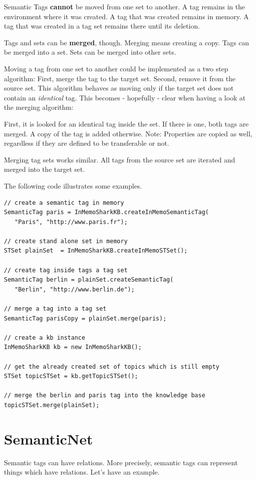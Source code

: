 Semantic Tags {\bf cannot} be moved from one set to another. A tag remains in the environment where it was created. A tag that was created remains in memory. A tag that was created in a tag set remains there until its deletion. 

Tags and sets can be {\bf merged}, though. Merging means creating a copy.
Tags can be merged into a set. Sets can be merged into other sets.

Moving a tag from one set to another could be implemented as a two step algorithm: First, merge the tag to the target set. Second, remove it from the source set. This algorithm behaves as moving only if the target set does not contain an {\it identical} tag. This becomes - hopefully - clear when having a look at the merging algorithm:

First, it is looked for
an identical tag inside the set. If there is one, both tags are merged. A copy of the tag is added otherwise. Note: Properties are copied as well, regardless if they are defined to be transferable or not.

Merging tag sets works similar. All tags from the source set are iterated and merged into the target set.

The following code illustrates some examples.

\begin{verbatim}
// create a semantic tag in memory
SemanticTag paris = InMemoSharkKB.createInMemoSemanticTag(
   "Paris", "http://www.paris.fr");

// create stand alone set in memory
STSet plainSet  = InMemoSharkKB.createInMemoSTSet();

// create tag inside tags a tag set
SemanticTag berlin = plainSet.createSemanticTag(
   "Berlin", "http://www.berlin.de");

// merge a tag into a tag set
SemanticTag parisCopy = plainSet.merge(paris);

// create a kb instance
InMemoSharkKB kb = new InMemoSharkKB();

// get the already created set of topics which is still empty 
STSet topicSTSet = kb.getTopicSTSet();

// merge the berlin and paris tag into the knowledge base
topicSTSet.merge(plainSet);
\end{verbatim}

\section{SemanticNet}
Semantic tags can have relations. More precisely, semantic tags can represent things which have relations. Let's have an example.


